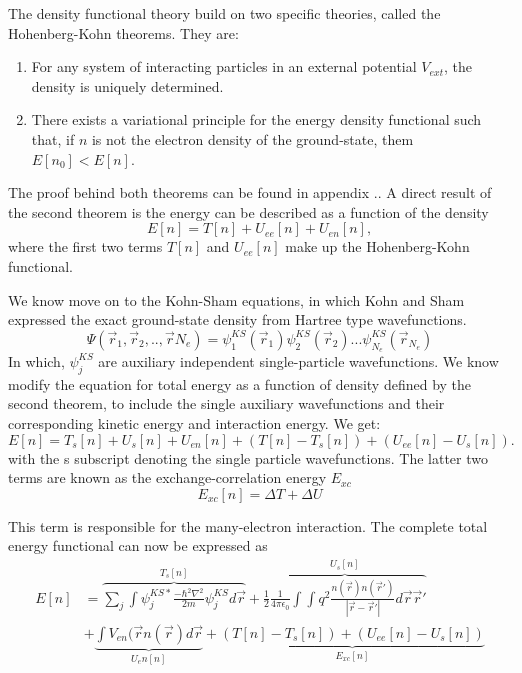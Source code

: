 The density functional theory build on two specific theories, called the Hohenberg-Kohn theorems. They are:
\begin{enumerate}
    \item For any system of interacting particles in an external potential $V_{ext}$, the density is uniquely determined.
    \item There exists a variational principle for the energy density functional such that, if $n$ is not the electron density of the ground-state, them $E[n_0] < E[n]$.
\end{enumerate}
The proof behind both theorems can be found in appendix .. A direct result of the second theorem is the energy can be described as a function of the density
\begin{equation}
    E[n] = T[n] + U_{ee}[n] + U_{en}[n],
\end{equation}
where the first two terms $T[n]$ and $U_{ee}[n]$ make up the Hohenberg-Kohn functional. 

We know move on to the Kohn-Sham equations, in which Kohn and Sham expressed the exact ground-state density from Hartree type wavefunctions. 
\begin{equation}
    \Psi(\vec{r}_1, \vec{r}_2 , .., \vec{r}{N_e}) = \psi_1^{KS}(\vec{r}_1)\psi_2^{KS}(\vec{r}_2)...\psi_{N_e}^{KS}(\vec{r}_{N_e})
\end{equation}
In which, $\psi_j^{KS}$ are auxiliary independent single-particle wavefunctions. We know modify the equation for total energy as a function of density defined by the second theorem, to include the single auxiliary wavefunctions and their corresponding kinetic energy and interaction energy. We get:
\begin{equation}
    E[n] = T_s[n] + U_s[n] + U_{en}[n] + (T[n] - T_s[n]) + (U_{ee}[n] - U_s[n]).
\end{equation}
with the s subscript denoting the single particle wavefunctions. The latter two terms are known as the exchange-correlation energy $E_{xc}$
\begin{equation}
    E_{xc}[n] = \Delta T + \Delta U
\end{equation}

This term is responsible for the many-electron interaction. The complete total energy functional can now be expressed as
\begin{equation}
    \begin{split}
    E[n] &= \overbrace{\sum_j \int \psi_j^{KS*}\frac{-\hbar^2 \nabla^2}{2m}\psi_j^{KS}d\vec{r}}^{T_s[n]} + \overbrace{\frac{1}{2}\frac{1}{4\pi \epsilon_0} \int \int q^2 \frac{n(\vec{r})n(\vec{r}')}{|\vec{r} - \vec{r}'|}d\vec{r}\vec{r}'}^{U_s[n]} \\ 
        &+ \underbrace{\int V_{en}(\vec{r}n(\vec{r})d\vec{r}}_{U_en[n]} + \underbrace{(T[n] - T_s[n]) + (U_{ee}[n] - U_s[n])}_{E_{xc}[n]}
    \end{split}
\end{equation}

